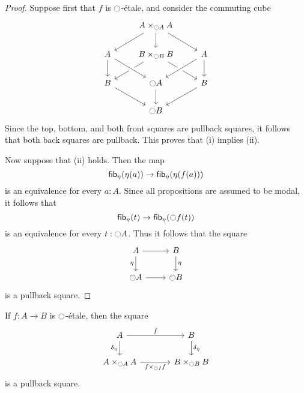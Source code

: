 \begin{proof}
Suppose first that $f$ is ${\ocircle}$-\'etale, and consider the commuting cube
\begin{equation*}
\begin{tikzcd}
& A\times_{\modal A} A \arrow[dl] \arrow[d] \arrow[dr] \\
A \arrow[d] & B\times_{\modal B} B \arrow[dl] \arrow[dr] & A \arrow[dl,crossing over] \arrow[d] \\
B \arrow[dr] & \modal A \arrow[from=ul,crossing over] \arrow[d] & B \arrow[dl] \\
& \modal B
\end{tikzcd}
\end{equation*}
Since the top, bottom, and both front squares are pullback squares, it follows that both back squares are pullback. This proves that (i) implies (ii).

Now suppose that (ii) holds. Then the map
\begin{equation*}
\mathsf{fib}_{{\eta_{}}}({\eta_{}}(a))\to \mathsf{fib}_{{\eta_{}}}({\eta_{}}(f(a)))
\end{equation*}
is an equivalence for every $a:A$. Since all propositions are assumed to be modal, it follows that
\begin{equation*}
\mathsf{fib}_{{\eta_{}}}(t)\to \mathsf{fib}_{{\eta_{}}}({\ocircle} f(t))
\end{equation*}
is an equivalence for every $t:{\ocircle} A$. Thus it follows that the square
\begin{equation*}
\begin{tikzcd}
A \arrow[d,swap,"\modalunit"] \arrow[r] & B \arrow[d,"\modalunit"] \\
\modal A \arrow[r] & \modal B
\end{tikzcd}
\end{equation*}
is a pullback square.
\end{proof}

\begin{cor}
If $f:A\to B$ is ${\ocircle}$-\'etale, then the square
\begin{equation*}
\begin{tikzcd}[column sep=large]
A \arrow[d,swap,"\delta_{\modalunit}"] \arrow[r,"f"] & B \arrow[d,"\delta_{\modalunit}"] \\
A\times_{\modal A} A \arrow[r,swap,"f\times_{\modal f}f"] & B\times_{\modal B} B
\end{tikzcd}
\end{equation*}
is a pullback square.
\end{cor}

